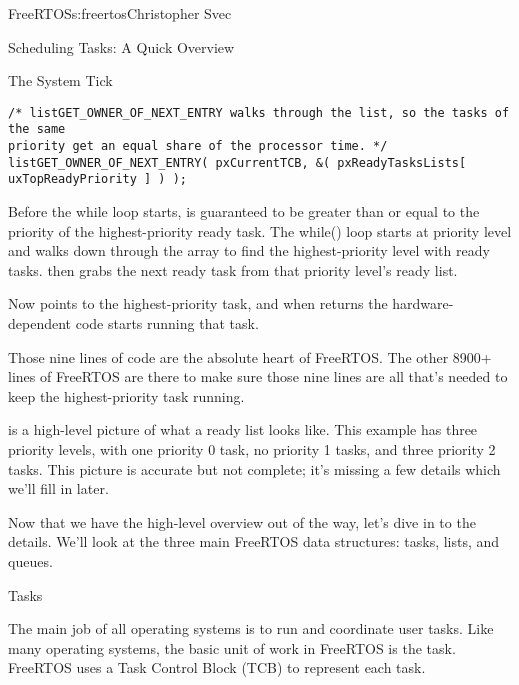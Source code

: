 \begin{aosachapter}{FreeRTOS}{s:freertos}{Christopher Svec}
\begin{aosasect1}{Scheduling Tasks: A Quick Overview}
\begin{aosasect2}{The System Tick}
\begin{verbatim}
/* listGET_OWNER_OF_NEXT_ENTRY walks through the list, so the tasks of the same 
priority get an equal share of the processor time. */
listGET_OWNER_OF_NEXT_ENTRY( pxCurrentTCB, &( pxReadyTasksLists[ uxTopReadyPriority ] ) );
\end{verbatim}

Before the while loop starts,  is guaranteed
to be greater than or equal to the priority of the highest-priority
ready task. The while() loop starts at priority level
 and walks down through the
 array to find the highest-priority level
with ready tasks.  then grabs
the next ready task from that priority level's ready list.

Now  points to the highest-priority task, and when
 returns the hardware-dependent code starts
running that task.

Those nine lines of code are the absolute heart of FreeRTOS. The other
8900+ lines of FreeRTOS are there to make sure those nine lines are
all that's needed to keep the highest-priority task running.

\end{aosasect2}


 is a high-level picture of what a
ready list looks like. This example has three priority levels, with
one priority 0 task, no priority 1 tasks, and three priority 2
tasks. This picture is accurate but not complete; it's missing a few
details which we'll fill in later.


Now that we have the high-level overview out of the way, let's dive in
to the details.  We'll look at the three main FreeRTOS data
structures: tasks, lists, and queues.

\end{aosasect1}

\begin{aosasect1}{Tasks}

The main job of all operating systems is to run and coordinate user
tasks. Like many operating systems, the basic unit of work in FreeRTOS
is the task. FreeRTOS uses a Task Control Block (TCB) to represent
each task. 


\end{aosasect1}
\end{aosachapter}
